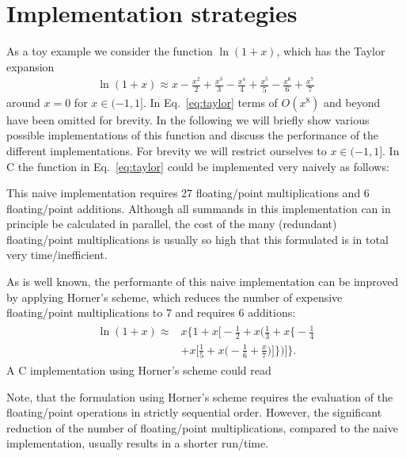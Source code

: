 \documentclass[10pt,DIV16,twocolumn,numbers=noenddot]{scrartcl}
\begin{document}
\section{Implementation strategies}
\label{sec:toymodel}

As a toy example we consider the function $\ln(1+x)$, which has the
Taylor expansion
%
\begin{align}
  \ln(1+x) \approx x - \frac{x^2}{2} + \frac{x^3}{3} - \frac{x^4}{4} + \frac{x^5}{5} - \frac{x^6}{6} + \frac{x^7}{7}
  \label{eq:taylor}
\end{align}
%
around $x=0$ for $x\in(-1,1]$.  In Eq.~\eqref{eq:taylor} terms of
$O(x^8)$ and beyond have been omitted for brevity.  In the following
we will briefly show various possible implementations of this function
and discuss the performance of the different implementations.  For
brevity we will restrict ourselves to $x\in(-1,1]$.  In C the function
in Eq.~\eqref{eq:taylor} could be implemented very naively as follows:
%

%
This naive implementation requires 27 floating\-/point multiplications
and 6 floating\-/point additions.  Although all summands in this
implementation can in principle be calculated in parallel, the cost of
the many (redundant) floating\-/point multiplications is usually so
high that this formulated is in total very time\-/inefficient.

As is well known, the performante of this naive implementation can be
improved by applying Horner's scheme, which reduces the number of
expensive floating\-/point multiplications to 7 and requires 6
additions:
%
\begin{align}
\begin{split}
  \ln(1+x) \approx{}& x \bigg\{1 + x \bigg[-\frac{1}{2} + x \bigg(\frac{1}{3} + x \bigg\{-\frac{1}{4} \\
  &+ x \bigg[\frac{1}{5} + x\bigg(-\frac{1}{6} + \frac{x}{7}\bigg)\bigg]\bigg\}\bigg)\bigg]\bigg\}.
\end{split}\label{eq:horner}%
\end{align}
%
A C implementation using Horner's scheme could read
%

%
Note, that the formulation using Horner's scheme requires the
evaluation of the floating\-/point operations in strictly sequential
order.  However, the significant reduction of the number of
floating\-/point multiplications, compared to the naive
implementation, usually results in a shorter run\-/time.
\end{document}
